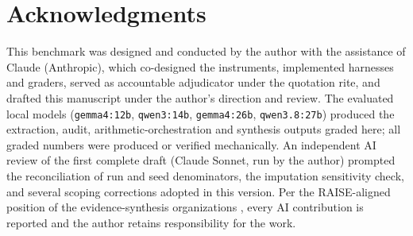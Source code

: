 \documentclass[11pt]{article}
\begin{document}
\section*{Acknowledgments}

This benchmark was designed and conducted by the author with the assistance of Claude (Anthropic), which co-designed the instruments, implemented harnesses and graders, served as accountable adjudicator under the quotation rite, and drafted this manuscript under the author's direction and review. The evaluated local models (\texttt{gemma4:12b}, \texttt{qwen3:14b}, \texttt{gemma4:26b}, \texttt{qwen3.8:27b}) produced the extraction, audit, arithmetic-orchestration and synthesis outputs graded here; all graded numbers were produced or verified mechanically. An independent AI review of the first complete draft (Claude Sonnet, run by the author) prompted the reconciliation of run and seed denominators, the imputation sensitivity check, and several scoping corrections adopted in this version. Per the RAISE-aligned position of the evidence-synthesis organizations \citep{flemyng2025position}, every AI contribution is reported and the author retains responsibility for the work.


\end{document}
